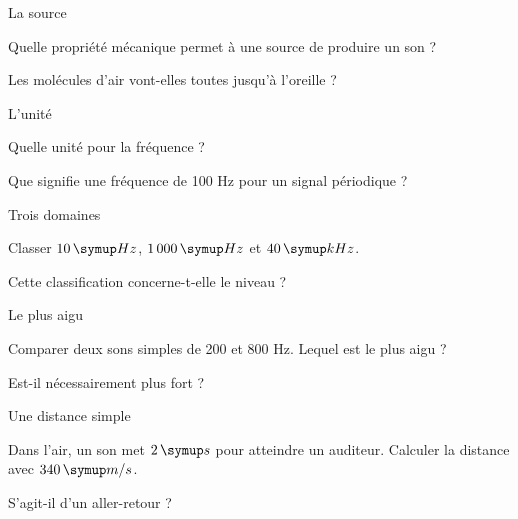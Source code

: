 \par\noindent\begin{minipage}{\linewidth}
\begin{exercice}[1]{La source}
\begin{questions}
\item Quelle propriété mécanique permet à une source de produire un son ?
\item Les molécules d’air vont-elles toutes jusqu’à l’oreille ?
\end{questions}
\end{exercice}
\end{minipage}
\par\noindent\begin{minipage}{\linewidth}
\begin{exercice}[1]{L’unité}
\begin{questions}
\item Quelle unité pour la fréquence ?
\item Que signifie une fréquence de 100 Hz pour un signal périodique ?
\end{questions}
\end{exercice}
\end{minipage}
\par\noindent\begin{minipage}{\linewidth}
\begin{exercice}[1]{Trois domaines}
\begin{questions}
\item Classer $10\unite{Hz}$, $1\,000\unite{Hz}$ et $40\unite{kHz}$.
\item Cette classification concerne-t-elle le niveau ?
\end{questions}
\end{exercice}
\end{minipage}
\par\noindent\begin{minipage}{\linewidth}
\begin{exercice}[1]{Le plus aigu}
\begin{questions}
\item Comparer deux sons simples de 200 et 800 Hz. Lequel est le plus aigu ?
\item Est-il nécessairement plus fort ?
\end{questions}
\end{exercice}
\end{minipage}
\clearpage{}
\par\noindent\begin{minipage}{\linewidth}
\begin{exercice}[2]{Une distance simple}
\begin{questions}
\item Dans l’air, un son met $2\unite s$ pour atteindre un auditeur. Calculer la distance avec $340\unite{m/s}$.
\item S’agit-il d’un aller-retour ?
\end{questions}
\end{exercice}
\end{minipage}
